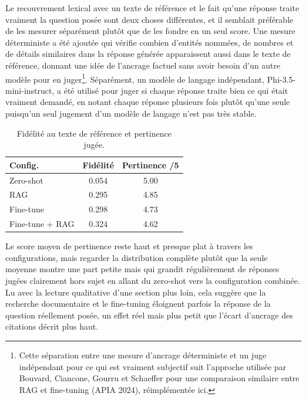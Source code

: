 \documentclass[11pt, a4paper]{article}
\begin{document}
Le recouvrement lexical avec un texte de r\'ef\'erence et le fait qu'une r\'eponse traite vraiment la question pos\'ee sont deux choses diff\'erentes, et il semblait pr\'ef\'erable de les mesurer s\'epar\'ement plut\^ot que de les fondre en un seul score. Une mesure d\'eterministe a \'et\'e ajout\'ee qui v\'erifie combien d'entit\'es nomm\'ees, de nombres et de d\'etails similaires dans la r\'eponse g\'en\'er\'ee apparaissent aussi dans le texte de r\'ef\'erence, donnant une id\'ee de l'ancrage factuel sans avoir besoin d'un autre mod\`ele pour en juger\footnote{Cette s\'eparation entre une mesure d'ancrage d\'eterministe et un juge ind\'ependant pour ce qui est vraiment subjectif suit l'approche utilis\'ee par Bouvard, Ciancone, Gourru et Schaeffer pour une comparaison similaire entre RAG et fine-tuning (APIA 2024), r\'eimpl\'ement\'ee ici.}. S\'epar\'ement, un mod\`ele de langage ind\'ependant, Phi-3.5-mini-instruct, a \'et\'e utilis\'e pour juger si chaque r\'eponse traite bien ce qui \'etait vraiment demand\'e, en notant chaque r\'eponse plusieurs fois plut\^ot qu'une seule puisqu'un seul jugement d'un mod\`ele de langage n'est pas tr\`es stable.

\begin{table}[H]
\centering
\small
\begin{tabular}{lcc}
\toprule
\textbf{Config.} & \textbf{Fid\'elit\'e} & \textbf{Pertinence /5} \\
\midrule
Zero-shot & 0.054 & 5.00 \\
RAG & 0.295 & 4.85 \\
Fine-tune & 0.298 & 4.73 \\
Fine-tune + RAG & 0.324 & 4.62 \\
\bottomrule
\end{tabular}
\caption{Fid\'elit\'e au texte de r\'ef\'erence et pertinence jug\'ee.}
\label{tab:fidjudge}
\end{table}

Le score moyen de pertinence reste haut et presque plat \`a travers les configurations, mais regarder la distribution compl\`ete plut\^ot que la seule moyenne montre une part petite mais qui grandit r\'eguli\`erement de r\'eponses jug\'ees clairement hors sujet en allant du zero-shot vers la configuration combin\'ee. Lu avec la lecture qualitative d'une section plus loin, cela sugg\`ere que la recherche documentaire et le fine-tuning \'eloignent parfois la r\'eponse de la question r\'eellement pos\'ee, un effet r\'eel mais plus petit que l'\'ecart d'ancrage des citations d\'ecrit plus haut.
\end{document}
